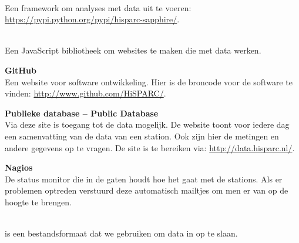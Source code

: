 \textbf{\sapphire} \\
Een \python framework om analyses met \hisparc data uit te voeren:
\url{https://pypi.python.org/pypi/hisparc-sapphire/}.

\textbf{\jsparc} \\
Een JavaScript bibliotheek om websites te maken die met \hisparc data
werken.

\textbf{GitHub} \\
Een website voor software ontwikkeling. Hier is de broncode voor de
\hisparc software te vinden: \url{http://www.github.com/HiSPARC/}.

\textbf{Publieke database -- Public Database} \\
Via deze site is toegang tot de \hisparc data mogelijk. De website toont
voor iedere dag een samenvatting van de data van een station. Ook zijn
hier de metingen en andere gegevens op te vragen. De site is te bereiken
via: \url{http://data.hisparc.nl/}.

\textbf{Nagios} \\
De status monitor die in de gaten houdt hoe het gaat met de stations.
Als er problemen optreden verstuurd deze automatisch mailtjes om men er
van op de hoogte te brengen.

\textbf{\hdf} \\
\hdf is een bestandsformaat dat we gebruiken om data in op te slaan.


